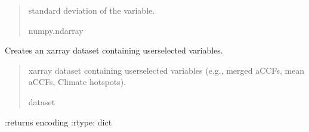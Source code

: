\documentclass[a4paper,11pt,english]{sphinxmanual}
\begin{document}
\begin{fulllineitems}
\begin{fulllineitems}
\begin{quote}
\begin{description}
\sphinxAtStartPar
standard deviation of the variable.

\sphinxAtStartPar
numpy.ndarray

\end{description}\end{quote}

\end{fulllineitems}


\begin{fulllineitems}
\label{\detokenize{modules:climaccf.accf.GeTaCCFs.get_xarray}}
\pysigstartsignatures
{}
\pysigstopsignatures
\sphinxAtStartPar
Creates an xarray dataset containing user\sphinxhyphen{}selected variables.
\begin{quote}\begin{description}
\sphinxAtStartPar
xarray dataset containing user\sphinxhyphen{}selected variables (e.g., merged aCCFs, mean aCCFs, Climate hotspots).

\sphinxAtStartPar
dataset

\end{description}\end{quote}

\sphinxAtStartPar
:returns encoding
:rtype: dict

\end{fulllineitems}


\end{fulllineitems}

\label{\detokenize{modules:module-climaccf.accf}}
\end{document}
